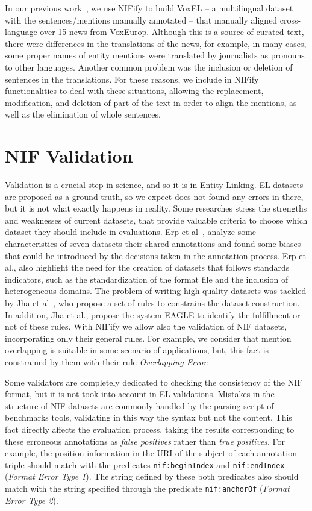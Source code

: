 \documentclass{llncs}
\begin{document}
In our previous work~\cite{VoxEL2018}, we use NIFify to build VoxEL -- a multilingual dataset with the sentences/mentions manually annotated -- that manually aligned cross-language over 15 news from VoxEurop. Although this is a source of curated text, there were differences in the translations of the news, for example, in many cases, some proper names of entity mentions were translated by journalists as pronouns to other languages. Another common problem was the inclusion or deletion of sentences in the translations. For these reasons, we include in NIFify functionalities to deal with these situations, allowing the replacement, modification, and deletion of part of the text in order to align the mentions, as well as the elimination of whole sentences. 

\section{NIF Validation}

Validation is a crucial step in science, and so it is in Entity Linking. EL datasets are proposed as a ground truth, so we expect does not found any errors in there, but it is not what exactly happens in reality. Some researches stress the strengths and weaknesses of current datasets, that provide valuable criteria to choose which dataset they should include in evaluations. Erp et al~\cite{Marieke2016}, analyze some characteristics of seven datasets their shared annotations and found some biases that could be introduced by the decisions taken in the annotation process. Erp et al., also highlight the need for the creation of datasets that follows standards indicators, such as the standardization of the format file and the inclusion of heterogeneous domains. The problem of writing high-quality datasets was tackled by Jha et al~\cite{Kunal2017}, who propose a set of rules to constrains the dataset construction. In addition, Jha et al., propose the system EAGLE to identify the fulfillment or not of these rules. With NIFify we allow also the validation of NIF datasets, incorporating only their general rules. For example, we consider that mention overlapping is suitable in some scenario of applications, but, this fact is constrained by them with their rule \textit{Overlapping Error}.

Some validators are completely dedicated to checking the consistency of the NIF format, but it is not took into account in EL validations. Mistakes in the structure of NIF datasets are commonly handled by the parsing script of benchmarks tools, validating in this way the syntax but not the content. This fact directly affects the evaluation process, taking the results corresponding to these erroneous annotations as \textit{false positives} rather than \textit{true positives}. For example, the position information in the URI of the subject of each annotation triple should match with the predicates \texttt{nif:beginIndex} and \texttt{nif:endIndex} (\textit{Format Error Type 1}). The string defined by these both predicates also should match with the string specified through the predicate \texttt{nif:anchorOf} (\textit{Format Error Type 2}). 
\end{document}
